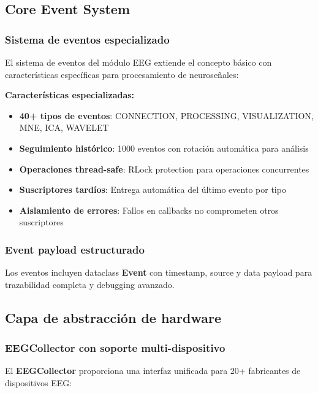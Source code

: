 \subsection{Core Event System}
\label{subsec:core_event_system_eeg}

\subsubsection{Sistema de eventos especializado}

El sistema de eventos del módulo EEG extiende el concepto básico con características específicas para procesamiento de neuroseñales:

\textbf{Características especializadas:}
\begin{itemize}
    \item \textbf{40+ tipos de eventos}: CONNECTION, PROCESSING, VISUALIZATION, MNE, ICA, WAVELET
    \item \textbf{Seguimiento histórico}: 1000 eventos con rotación automática para análisis
    \item \textbf{Operaciones thread-safe}: RLock protection para operaciones concurrentes
    \item \textbf{Suscriptores tardíos}: Entrega automática del último evento por tipo
    \item \textbf{Aislamiento de errores}: Fallos en callbacks no comprometen otros suscriptores
\end{itemize}

\subsubsection{Event payload estructurado}

Los eventos incluyen dataclass \textbf{Event} con timestamp, source y data payload para trazabilidad completa y debugging avanzado.

\subsection{Capa de abstracción de hardware}
\label{subsec:abstraccion_hardware_eeg}

\subsubsection{EEGCollector con soporte multi-dispositivo}

El \textbf{EEGCollector} proporciona una interfaz unificada para 20+ fabricantes de dispositivos EEG:

